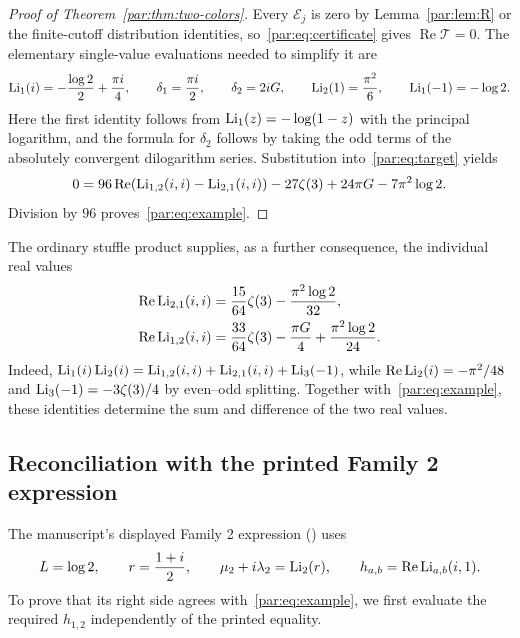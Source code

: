 \begin{proof}[Proof of Theorem~\ref{par:thm:two-colors}]
Every $\mathcal E_j$ is zero by Lemma~\ref{par:lem:R} or the finite-cutoff
distribution identities, so~\eqref{par:eq:certificate} gives
$\operatorname{Re}\mathcal T=0$.
The elementary single-value evaluations needed to simplify it are
\[
 \operatorname{Li}_1(i)=-\frac{\log2}{2}+\frac{\pi i}{4},\qquad
 \delta_1=\frac{\pi i}{2},\qquad
 \delta_2=2iG,\qquad
 \operatorname{Li}_2(1)=\frac{\pi^2}{6},\qquad
 \operatorname{Li}_1(-1)=-\log2.
\]
Here the first identity follows from $\operatorname{Li}_1(z)=-\log(1-z)$ with the
principal logarithm, and the formula for $\delta_2$ follows by taking the
odd terms of the absolutely convergent dilogarithm series.
Substitution into~\eqref{par:eq:target} yields
\[
 0=96\operatorname{Re}\!\left(\operatorname{Li}_{1,2}(i,i)-\operatorname{Li}_{2,1}(i,i)\right)
     -27\zeta(3)+24\pi G-7\pi^2\log2.
\]
Division by $96$ proves~\eqref{par:eq:example}.
\end{proof}

The ordinary stuffle product supplies, as a further consequence, the
individual real values
\begin{align}
 \operatorname{Re}\operatorname{Li}_{2,1}(i,i)
   &=\frac{15}{64}\zeta(3)-\frac{\pi^2\log2}{32},
   \label{par:eq:individual-21}\\
 \operatorname{Re}\operatorname{Li}_{1,2}(i,i)
   &=\frac{33}{64}\zeta(3)-\frac{\pi G}{4}
       +\frac{\pi^2\log2}{24}.
   \label{par:eq:individual-12}
\end{align}
Indeed, $\operatorname{Li}_1(i)\operatorname{Li}_2(i)=\operatorname{Li}_{1,2}(i,i)+\operatorname{Li}_{2,1}(i,i)+\operatorname{Li}_3(-1)$,
while $\operatorname{Re}\operatorname{Li}_2(i)=-\pi^2/48$ and
$\operatorname{Li}_3(-1)=-3\zeta(3)/4$ by even--odd splitting.
Together with~\eqref{par:eq:example}, these identities determine the sum
and difference of the two real values.

\subsection{Reconciliation with the printed Family 2 expression}
\label{par:sec:family2-bridge}

The manuscript's displayed Family 2 expression
() uses
\[
 L=\log2,\qquad r=\frac{1+i}{2},\qquad
 \mu_2+i\lambda_2=\operatorname{Li}_2(r),\qquad
 h_{a,b}=\operatorname{Re}\operatorname{Li}_{a,b}(i,1).
\]
To prove that its right side agrees with~\eqref{par:eq:example}, we first
evaluate the required $h_{1,2}$ independently of the printed equality.

